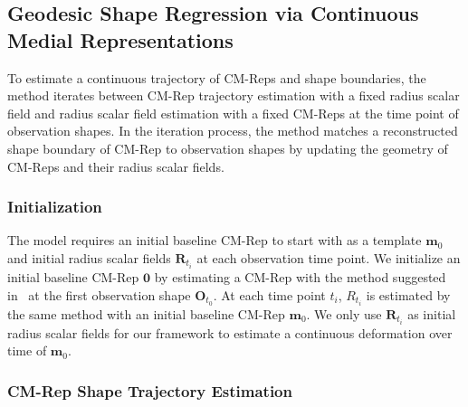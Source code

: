 \documentclass{llncs}
\begin{document}
\subsection{Geodesic Shape Regression via Continuous Medial Representations}
\label{ssec:Regression}

To estimate a continuous trajectory of CM-Reps and shape boundaries, the method iterates between CM-Rep trajectory estimation with a fixed radius scalar field and radius scalar field estimation with a fixed CM-Reps at the time point of observation shapes. In the iteration process, the method matches a reconstructed shape boundary of CM-Rep to observation shapes by updating the geometry of CM-Reps and their radius scalar fields.

\subsubsection{Initialization}
The model requires an initial baseline CM-Rep to start with as a template $\mathbf{m}_0$ and initial radius scalar fields $\mathbf{R}_{t_i}$ at each observation time point. 
We initialize an initial baseline CM-Rep $\mathbf{0}$ by estimating a CM-Rep with the method suggested in~\cite{Yushkevich2009} at the first observation shape $\mathbf{O}_{t_0}$.
At each time point $t_i$, $R_{t_i}$ is estimated by the same method with an initial baseline CM-Rep $\mathbf{m}_0$. We only use $\mathbf{R}_{t_i}$ as initial radius scalar fields for our framework to estimate a continuous deformation over time of $\mathbf{m}_0$.

\subsubsection{CM-Rep Shape Trajectory Estimation}
\label{sssec:GeoUpdate}
\end{document}
